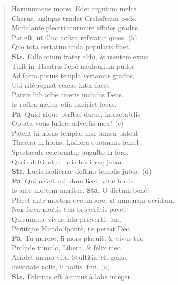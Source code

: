 \documentclass[a4paper,12pt]{article}
\begin{document}
\begin{verse}
Hominumque mores. Edet argutum melos\\[0pt]
Chorus, agilique tundet Orcheſtram pede,\\[0pt]
Modulante plectri murmure effuſos gradus.\\[0pt]
Par eſt, ut illuc noſtra referatur quies, (b)\footnotemark\\[0pt]
Quo tota certatim unda popularis fluet.\\[0pt]
\textbf{Sta.} Falle otium frater alibi, \& mentem exue:\\[0pt]
Tulit in Theatris ſæpè naufragium pudor.\\[0pt]
Ad ſacra potius templa vertamus gradus,\\[0pt]
Ubi ritè regnat cereas inter faces\\[0pt]
Parvæ ſub orbe cereris incluſus Deus.\\[0pt]
Is noſtra melius otia excipiet locus.\\[0pt]
\textbf{Pa.} Quid uſque perſtas durus, intractabilis\\[0pt]
Optata votis ludere adverſis mea? (c)\footnotemark\\[0pt]
Patent in horas templa; non tamen patent\\[0pt]
Theatra in horas. Ludicra quotannis ſemel\\[0pt]
Spectacula celebrantur auguſto in foro,\\[0pt]
Queis deſtinatur lucis hodiernę jubar.\\[0pt]
\textbf{Sta.} Lucis hodiernæ deſtino templis jubar. (d)\footnotemark\\[0pt]
\textbf{Pa.} Qui neſcit uti, dum licet, vitæ bonis.\\[0pt]
Is ante mortem moritur. \textbf{Sta.} O dictum benè!\\[0pt]
Placet ante mortem occumbere, ut nunquam occidam.\\[0pt]
Non ſæva mortis tela properãtis pavet\\[0pt]
Quicumque vivus fata prævertit ſua,\\[0pt]
Periitque Mundo ſpontè, ne pereat Deo.\\[0pt]
\textbf{Pa.} Tu morere, ſi mors placuit, \& vivus tuo\\[0pt]
Prolude tumulo, Libera, \& felix meo\\[0pt]
Arridet animo vita. Stultitiæ eſt genus\\[0pt]
Felicitate nolle, ſi poſſis. frui. (a)\footnotemark\\[0pt]
\textbf{Sta.} Felicitas eſt Animus à labe integer.\\[0pt]

\end{verse}
\end{document}
